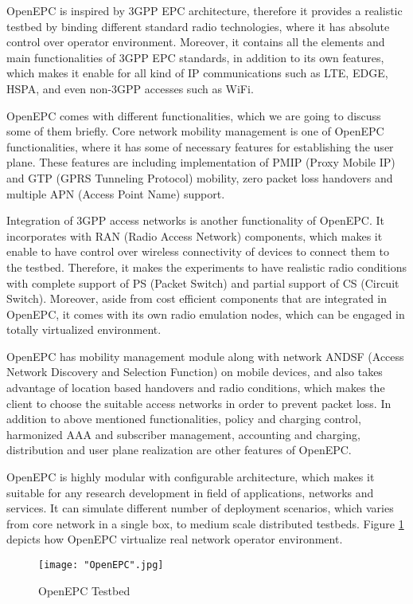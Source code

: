 \documentclass[english]{tktltiki2}
\theoremstyle{definition}
\theoremstyle{remark}
\begin{document}
OpenEPC is inspired by 3GPP EPC architecture, therefore it provides a realistic testbed by binding different standard radio technologies, where it has absolute control over operator environment. Moreover, it contains all the elements and main functionalities of 3GPP EPC standards, in addition to its own features, which makes it enable for all kind of IP communications such as LTE, EDGE, HSPA, and even non-3GPP accesses such as WiFi. 

OpenEPC comes with different functionalities, which we are going to discuss some of them briefly. Core network mobility management is one of OpenEPC functionalities, where it has some of necessary features for establishing the user plane. These features are including  implementation of PMIP (Proxy Mobile IP) and GTP (GPRS Tunneling Protocol) mobility, zero packet loss handovers and multiple APN (Access Point Name) support.  

Integration of 3GPP access networks is another functionality of OpenEPC. It incorporates with RAN (Radio Access Network) components, which makes it enable to have control over wireless connectivity of devices to connect them to the testbed. Therefore, it makes the experiments to have realistic radio conditions with complete support of PS (Packet Switch) and partial support of CS (Circuit Switch). Moreover, aside from cost efficient components that are integrated in OpenEPC, it comes with its own radio emulation nodes, which can be engaged in totally virtualized environment. 

OpenEPC has mobility management module along with network ANDSF (Access Network Discovery and Selection Function) on mobile devices, and also takes advantage of location based handovers and radio conditions, which makes the client to choose the suitable access networks in order to prevent packet loss. In addition to above mentioned functionalities, policy and charging control, harmonized AAA and subscriber management, accounting and charging, distribution and user plane realization are other features of OpenEPC. 

OpenEPC is highly modular with configurable architecture, which makes it suitable for any research development in field of applications, networks and services. It can simulate different number of deployment scenarios, which varies from core network in a single box, to medium scale distributed testbeds. Figure \ref{fig:OpenEPC} depicts how OpenEPC virtualize real network operator environment.  

\begin{figure}[h!t]
\centering
{}
\texttt{[image: "OpenEPC".jpg]}
\caption{OpenEPC Testbed \cite{OpenEPC}}
\label{fig:OpenEPC}
\end{figure}
\end{document}

